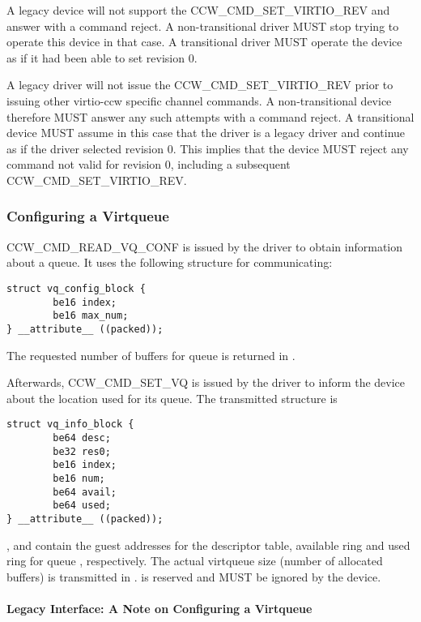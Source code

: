 A legacy device will not support the CCW_CMD_SET_VIRTIO_REV and answer
with a command reject. A non-transitional driver MUST stop trying to
operate this device in that case. A transitional driver MUST operate
the device as if it had been able to set revision 0.

A legacy driver will not issue the CCW_CMD_SET_VIRTIO_REV prior to
issuing other virtio-ccw specific channel commands. A non-transitional
device therefore MUST answer any such attempts with a command reject.
A transitional device MUST assume in this case that the driver is a
legacy driver and continue as if the driver selected revision 0. This
implies that the device MUST reject any command not valid for revision
0, including a subsequent CCW_CMD_SET_VIRTIO_REV.

\subsubsection{Configuring a Virtqueue}\label{sec:Virtio Transport Options / Virtio over channel I/O / Device Initialization / Configuring a Virtqueue}

CCW_CMD_READ_VQ_CONF is issued by the driver to obtain information
about a queue. It uses the following structure for communicating:

\begin{lstlisting}
struct vq_config_block {
        be16 index;
        be16 max_num;
} __attribute__ ((packed));
\end{lstlisting}

The requested number of buffers for queue  is returned in
.

Afterwards, CCW_CMD_SET_VQ is issued by the driver to inform the
device about the location used for its queue. The transmitted
structure is

\begin{lstlisting}
struct vq_info_block {
        be64 desc;
        be32 res0;
        be16 index;
        be16 num;
        be64 avail;
        be64 used;
} __attribute__ ((packed));
\end{lstlisting}

,  and  contain the guest addresses for the descriptor table,
available ring and used ring for queue , respectively. The actual
virtqueue size (number of allocated buffers) is transmitted in .
 is reserved and MUST be ignored by the device.

\paragraph{Legacy Interface: A Note on Configuring a Virtqueue}\label{sec:Virtio Transport Options / Virtio over channel I/O / Device Initialization / Configuring a Virtqueue / Legacy Interface: A Note on Configuring a Virtqueue}


